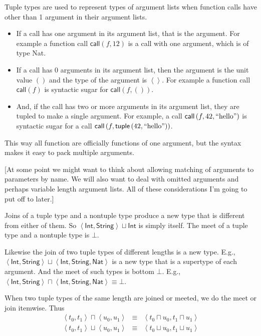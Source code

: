 \documentclass[12pt]{article}
\begin{document}
Tuple types are used to represent types of argument lists when function
calls have other than 1 argument in their argument lists.

\begin{itemize}
\item If a call has one argument in its argument list, that is the argument.
For example a function call $\mathsf{call}(f,12)$ is a call with one
argument, which is of type \textsf{Nat}.

\item If a call has 0 arguments in its argument list, then the argument is
the unit value $()$ and the type of the argument is $\left\langle
{}\right\rangle $. For example a function call $\mathsf{call}(f)$ is
syntactic sugar for $\mathsf{call}(f,())$.

\item And, if the call has two or more arguments in its argument list, they
are tupled to make a single argument. For example, a call $\mathsf{call}%
\left( f,42,\text{\textquotedblleft hello\textquotedblright }\right) $ is
syntactic sugar for a call $\mathsf{call}\left( f,\mathsf{tuple}\left( 42,%
\text{\textquotedblleft hello\textquotedblright }\right) \right) $.
\end{itemize}

\noindent This way all function are officially functions of one argument,
but the syntax makes it easy to pack multiple arguments.

[At some point we might want to think about allowing matching of arguments
to parameters by name. We will also want to deal with omitted arguments and
perhaps variable length argument lists. All of these considerations I'm
going to put off to later.]

Joins of a tuple type and a nontuple type produce a new type that is
different from either of them. So $\left\langle \mathsf{Int},\mathsf{String}%
\right\rangle \sqcup \mathsf{Int}$ is simply itself. The meet of a tuple
type and a nontuple type is $\bot $.

Likewise the join of two tuple types of different lengths is a new type.
E.g., $\left\langle \mathsf{Int},\mathsf{String}\right\rangle \sqcup
\left\langle \mathsf{Int},\mathsf{String},\mathsf{Nat}\right\rangle $ is a
new type that is a supertype of each argument. And the meet of such types is
bottom $\bot $. E.g.,$\left\langle \mathsf{Int},\mathsf{String}\right\rangle
\sqcap \left\langle \mathsf{Int},\mathsf{String},\mathsf{Nat}\right\rangle
\equiv \bot $.

When two tuple types of the same length are joined or meeted, we do the meet
or join itemwise. Thus 
\begin{eqnarray*}
\left\langle t_{0},t_{1}\right\rangle \sqcap \left\langle
u_{0},u_{1}\right\rangle &\equiv &\left\langle t_{0}\sqcap u_{0},t_{1}\sqcap
u_{1}\right\rangle \\
\left\langle t_{0},t_{1}\right\rangle \sqcup \left\langle
u_{0},u_{1}\right\rangle &\equiv &\left\langle t_{0}\sqcup u_{0},t_{1}\sqcup
u_{1}\right\rangle
\end{eqnarray*}
\end{document}
